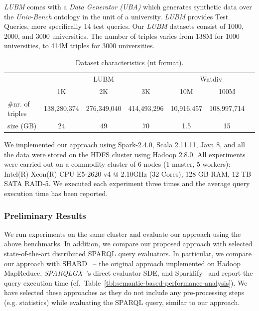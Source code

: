 \textit{LUBM} comes with a \textit{Data Generator (UBA)} which generates synthetic data over the \textit{Univ-Bench} ontology in the unit of a university. 
\textit{LUBM} provides Test Queries, more specifically 14 test queries.
Our \textit{LUBM} datasets consist of 1000, 2000, and 3000 universities.
The number of triples varies from 138M for 1000 universities, to 414M triples for 3000 universities.


\begin{table}
\centering
\begin{tabularx}{\textwidth}{Xcccccc}	
\toprule
\multirow{2}{*}{} & \multicolumn{3}{c|}{LUBM} & \multicolumn{3}{c}{Watdiv} \\
\cline{2-7}  \rule{0pt}{10pt}
&   \scriptsize{1K} & \scriptsize{2K} & \scriptsize{3K} & \scriptsize{10M} &\scriptsize{100M} &\\
\midrule
\scriptsize{\#nr. of triples}& \scriptsize{138,280,374} & \scriptsize{276,349,040} & \scriptsize{414,493,296}  &  \scriptsize{10,916,457} & \scriptsize{108,997,714} &  \\
\scriptsize{size (GB)}  & \scriptsize{24} & \scriptsize{49}  & \scriptsize{70} & \scriptsize{1.5} &\scriptsize{15} &\\
\bottomrule
\end{tabularx}
{\caption{Dataset characteristics (nt format).}\label{tab:semantic-based-dataset_info}}
\end{table}

We implemented our approach using Spark-2.4.0, Scala 2.11.11, Java 8, and all the data were stored on the HDFS cluster using Hadoop 2.8.0.
All experiments were carried out on a commodity cluster of 6 nodes (1 master, 5 workers): Intel(R) Xeon(R) CPU E5-2620 v4 @ 2.10GHz (32 Cores), 128 GB RAM, 12 TB SATA RAID-5.
We executed each experiment three times and the average query execution time has been reported.

\subsubsection{Preliminary Results}
We run experiments on the same cluster and evaluate our approach using the above benchmarks. 
In addition, we compare our proposed approach with selected state-of-the-art distributed SPARQL query evaluators.
In particular, we compare our approach with SHARD~\cite{Rohloff2010SHARD} -- the original approach implemented on Hadoop MapReduce, \emph{SPARQLGX}~\cite{sparqlgx-iswc-2016}'s direct evaluator SDE, and Sparklify~\cite{2019-sansa-sparklify-iswc} and report the query execution time (cf.\ Table~\ref{tbl:semantic-based-performance-analysis}).
We have selected these approaches as they do not include any pre-processing steps (e.g. statistics) while evaluating the SPARQL query, similar to our approach.

